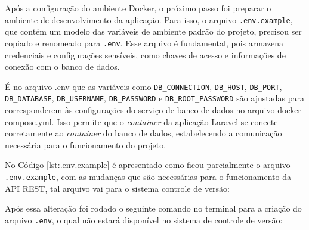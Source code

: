         
        
    
        \par Após a configuração do ambiente Docker, o próximo passo foi preparar o ambiente de desenvolvimento da aplicação. Para isso, o arquivo \texttt{.env.example}, que contém um modelo das variáveis de ambiente padrão do projeto, precisou ser copiado e renomeado para \texttt{.env}. Esse arquivo é fundamental, pois armazena credenciais e configurações sensíveis, como chaves de acesso e informações de conexão com o banco de dados.

        \begin{sloppypar}
            \par É no arquivo .env que as variáveis como \texttt{DB\_CONNECTION}, \texttt{DB\_HOST}, \texttt{DB\_PORT},  \texttt{DB\_DATABASE}, \texttt{DB\_USERNAME}, \texttt{DB\_PASSWORD} e \texttt{DB\_ROOT\_PASSWORD} são ajustadas para corresponderem às configurações do serviço de banco de dados no arquivo docker-compose.yml. Isso permite que o \textit{container} da aplicação Laravel se conecte corretamente ao \textit{container} do banco de dados, estabelecendo a comunicação necessária para o funcionamento do projeto.
        \end{sloppypar}

        \begin{sloppypar}
            \par No Código \ref{lst:.env.example} é apresentado como ficou parcialmente o arquivo \texttt{.env.example}, com as mudanças que são necessárias para o funcionamento da API REST, tal arquivo vai para o sistema controle de versão:
        \end{sloppypar}

        

        \par Após essa alteração foi rodado o seguinte comando no terminal para a criação do arquivo \texttt{.env}, o qual não estará disponível no sistema de controle de versão:

